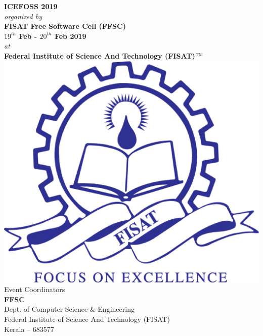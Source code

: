 \documentclass[notuble,10pt,a4paper]{leaflet}
\begin{document}
\begin{center}
{\large \textbf{ICEFOSS 2019}} \\[.3cm]
\textit{organized by}\\[.4cm]
{\large \textbf{FISAT Free Software Cell (FFSC)}}\\ [.3cm]
\textbf{{\large $19^{th}$ Feb - $20^{th}$ Feb 2019}}\\[.5cm]
\textit{{\small at}}\\[.3cm]
{\large\textbf{ Federal Institute of Science And Technology (FISAT)$^{\tiny{\mbox{TM}}}$}} \\[.4cm]
\includegraphics[scale=.13]{logod}\\
\vfill
Event Coordinators\\ 
\textbf{FFSC}\\
Dept. of Computer Science \& Engineering\\
Federal Institute of Science And Technology (FISAT)\\
Kerala – 683577
\end{center}
\end{document}
